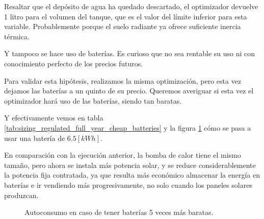 Resaltar que el depósito de agua ha quedado descartado, el optimizador devuelve
1 litro para el volumen del tanque, que es el valor del límite inferior para
esta variable. Probablemente porque el suelo radiante ya ofrece suficiente
inercia térmica.

Y tampoco se hace uso de baterías. Es curioso que no sea rentable su uso ni con
conocimiento perfecto de los precios futuros.

Para validar esta hipótesis, realizamos la misma optimización, pero esta vez
dejamos las baterías a un quinto de su precio. Queremos averiguar si esta vez
el optimizador hará uso de las baterías, siendo tan baratas.

Y efectivamente vemos en tabla
\ref{tab:sizing_regulated_full_year_cheap_batteries} y la figura
\ref{fig:sizing_regulated_full_year_cheap_batteries} cómo se pasa a usar una
batería de $6.5[kWh]$.

En comparación con la ejecución anterior, la bomba de calor tiene el mismo
tamaño, pero ahora se instala más potencia solar, y se reduce considerablemente
la potencia fija contratada, ya que resulta más económico almacenar la energía
en baterías e ir vendiendo más progresivamente, no solo cuando los paneles
solares produzcan.

\begin{figure}[h] \centering
	\centering
	
	\caption{Autoconsumo en caso de tener baterías 5 veces más baratas.}
	\label{fig:sizing_regulated_full_year_cheap_batteries}
\end{figure}

